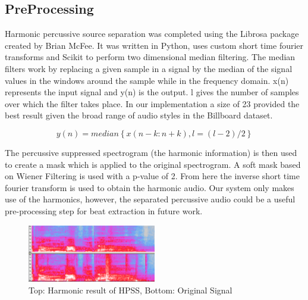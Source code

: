 \documentclass{article}
\begin{document}
\subsection{PreProcessing}

Harmonic percussive source separation was completed using the Librosa package
created by Brian McFee. It was written in Python, uses custom short time
fourier transforms and Scikit to perform two dimensional median filtering. The
median filters work by replacing a given sample in a signal by the median of
the signal values in the windows around the sample \cite{FitzGerald:11} while
in the frequency domain. x(n) represents the input signal and y(n) is the
output. l gives the number of samples over which the filter takes place. In our
implementation a size of 23 provided the best result given the broad range of
audio styles in the Billboard dataset.

$$y(n) = median \left \{x(n-k:n+k),l = (l-2)/2  \right \}$$

The percussive suppressed spectrogram (the harmonic information) is then used
to create a mask which is applied to the original spectrogram. A soft mask
based on Wiener Filtering is used with a p-value of 2. From here the inverse
short time fourier transform is used to obtain the harmonic audio. Our system
only makes use of the harmonics, however, the  separated percussive audio could
be a useful pre-processing step for beat extraction in future work.

\begin{figure}
   \centering
    \includegraphics[width=0.5\textwidth]{hpssspec.png}
   \caption{Top: Harmonic result of HPSS, Bottom: Original Signal}
   \label{fig:HPSS}
\end{figure}
\end{document}
